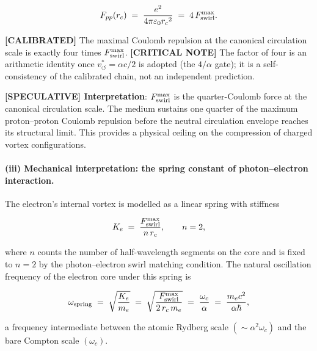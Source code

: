 \documentclass[11pt]{article}
\theoremstyle{definition}
\theoremstyle{plain}
\theoremstyle{remark}
\newcommand{\rc}{{r_c}}
\newcommand{\vchar}{v_{\!\boldsymbol{\circlearrowleft}}^{\ast}}
\begin{document}
        \begin{align}
            F_{pp}(\rc)
            \;=\; \frac{e^2}{4\pi\varepsilon_0 \rc^2}
            \;=\; 4\,F_{\rm swirl}^{\max}.
            \label{eq:Coulomb_core}
        \end{align}

        \textbf{[CALIBRATED]} The maximal Coulomb repulsion at the canonical circulation scale is exactly four times $F_{\rm swirl}^{\max}$. \textbf{[CRITICAL NOTE]} The factor of four is an arithmetic identity once $\vchar=\alpha c/2$ is adopted (the $4/\alpha$ gate); it is a self-consistency of the calibrated chain, not an independent prediction.

        \textbf{[SPECULATIVE] Interpretation}: $F_{\rm swirl}^{\max}$ is the quarter-Coulomb force at the canonical circulation scale. The medium sustains one quarter of the maximum proton--proton Coulomb repulsion before the neutral circulation envelope reaches its structural limit. This provides a physical ceiling on the compression of charged vortex configurations.

        \paragraph{(iii) Mechanical interpretation: the spring constant of photon--electron interaction.}

        The electron's internal vortex is modelled as a linear spring with stiffness

        \begin{align}
            K_e \;=\; \frac{F_{\rm swirl}^{\max}}{n\,\rc},
            \qquad n = 2,
            \label{eq:spring_K}
        \end{align}

        where $n$ counts the number of half-wavelength segments on the core and is fixed to $n=2$ by the photon--electron swirl matching condition. The natural oscillation frequency of the electron core under this spring is

        \begin{align}
            \omega_{\rm spring}
            \;=\; \sqrt{\frac{K_e}{m_e}}
            \;=\; \sqrt{\frac{F_{\rm swirl}^{\max}}{2\,\rc\,m_e}}
            \;=\; \frac{\omega_c}{\alpha}
            \;=\; \frac{m_e c^2}{\alpha\hbar},
            \label{eq:omega_spring}
        \end{align}

        a frequency intermediate between the atomic Rydberg scale $(\sim\alpha^2\omega_c)$ and the bare Compton scale $(\omega_c)$.
\end{document}
